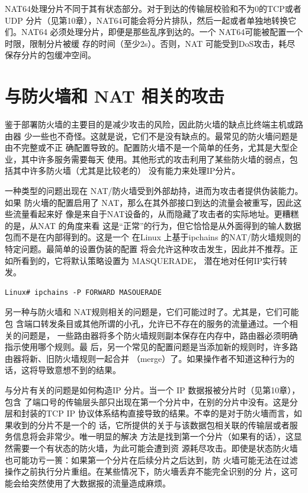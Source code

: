NAT64处理分片不同于其有状态部分。对于到达的传输层校验和不为0的TCP或者
UDP 分片（见第10章），NAT64可能会将分片排队，然后一起或者单独地转换它们。NAT64
必须处理分片，即便是那些乱序到达的。一个 NAT64可能被配置一个时限，限制分片被缓
存的时间（至少2s）。否则，NAT 可能受到DoS攻击，耗尽保存分片的包缓冲空间。

\section{与防火墙和 NAT 相关的攻击}

鉴于部署防火墙的主要目的是减少攻击的风险，因此防火墙的缺点比终端主机或路由器
少一些也不奇怪。这就是说，它们不是没有缺点的。最常见的防火墻问题是由不完整或不正
确配置导致的。配置防火墙不是一个简单的任务，尤其是大型企业，其中许多服务需要每天
使用。其他形式的攻击利用了某些防火墙的弱点，包括其中许多防火墙（尤其是比较老的）
没有能力来处理IP分片。

一种类型的问题出现在 NAT/防火墙受到外部劫持，进而为攻击者提供伪装能力。如果
防火墻的配置启用了 NAT，那么在其外部接口到达的流量会被重写，因此这些流量看起来好
像是来自于NAT设备的，从而隐藏了攻击者的实际地址。更糟糕的是，从NAT 的角度来看
这是“正常”的行为，但它恰恰是从外面得到的输人数据包而不是在内部得到的。这是一个
在Linux 上基于ipchains 的NAT/防火墙规则的特定问题。最简单的设置伪装的配置
将会允许这种攻击发生，因此并不推荐。正如所看到的，它将默认策略设置为 MASQUERADE，
潜在地对任何IP实行转发。

\begin{verbatim}    
Linux# ipchains -P FORWARD MASOUERADE
\end{verbatim}


另一种与防火墙和 NAT规则相关的问题是，它们可能过时了。尤其是，它们可能包
含端口转发条目或其他所谓的小孔，允许已不存在的服务的流量通过。一个相关的问题是，
一些路由器将多个防火墙规则副本保存在内存中，路由器必须明确指示使用哪个规则。最
后，另一个常见的配置问题是当添加新的规则时，许多路由器将新、旧防火墙规则一起合并
（merge）了。如果操作者不知道这种行为的话，这将导致意想不到的结果。

与分片有关的问题是如何构造IP 分片。当一个 IP 数据报被分片时（见第10章），包含
了端口号的传输层头部只出现在第一个分片中，在别的分片中没有。这是分层和封装的TCP
IP 协议体系结构直接导致的结果。不幸的是对于防火墻而言，如果收到的分片不是一个的
话，它所提供的关于与该数据包相关联的传输层或者服务信息将会非常少。唯一明显的解决
方法是找到第一个分片（如果有的话），这显然需要一个有状态的防火墙，为此可能会遭到资
源耗尽攻击。即使是状态防火墙也可能功亏一篑：如果第一个分片在后续分片之后达到，防
火墙可能无法在过滤操作之前执行分片重组。在某些情况下，防火墻丢弃不能完全识别的分
片，这可能会给突然使用了大数据报的流量造成麻烦。


